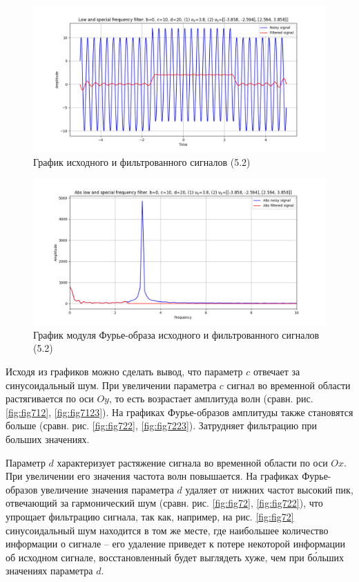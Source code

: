 \documentclass[a4paper, 12pt]{article}
\begin{document}
    \begin{figure}[H]
        \centering
        \includegraphics[scale=0.48]{5_nospec_nohigh.png}
        \captionsetup{skip=0pt}
        \caption{График исходного и фильтрованного сигналов (5.2)}
        \label{fig:fig772345}
    \end{figure}
    \begin{figure}[H]
        \centering
        \includegraphics[scale=0.48]{5_abs_nospec_nohigh.png}
        \captionsetup{skip=0pt}
        \caption{График модуля Фурье-образа исходного и фильтрованного сигналов (5.2)}
        \label{fig:fig782345}
    \end{figure}


    Исходя из графиков можно сделать вывод, что параметр $c$ отвечает за синусоидальный шум. При увеличении параметра $c$
    сигнал во временной области растягивается по оси $Oy$, то есть возрастает амплитуда волн (сравн. рис. \ref{fig:fig712}, \ref{fig:fig7123}).
    На графиках Фурье-образов амплитуды также становятся больше (сравн. рис. \ref{fig:fig722}, \ref{fig:fig7223}). Затрудняет фильтрацию
    при больших значениях.


    Параметр $d$ характеризует растяжение сигнала во временной области по оси $Ox$. При увеличении его значения частота волн повышается.
    На графиках Фурье-образов увеличение значения параметра $d$ удаляет от нижних частот высокий пик, отвечающий за
    гармонический шум (сравн. рис. \ref{fig:fig72}, \ref{fig:fig722}), что упрощает фильтрацию сигнала, так как, например, на рис. \ref{fig:fig72}
    синусоидальный шум находится в том же месте, где наибольшее количество информации о сигнале -- его удаление приведет к потере некоторой информации об исходном сигнале,
    восстановленный будет выглядеть хуже, чем при б\'{о}льших значениях параметра $d$.
\end{document}
